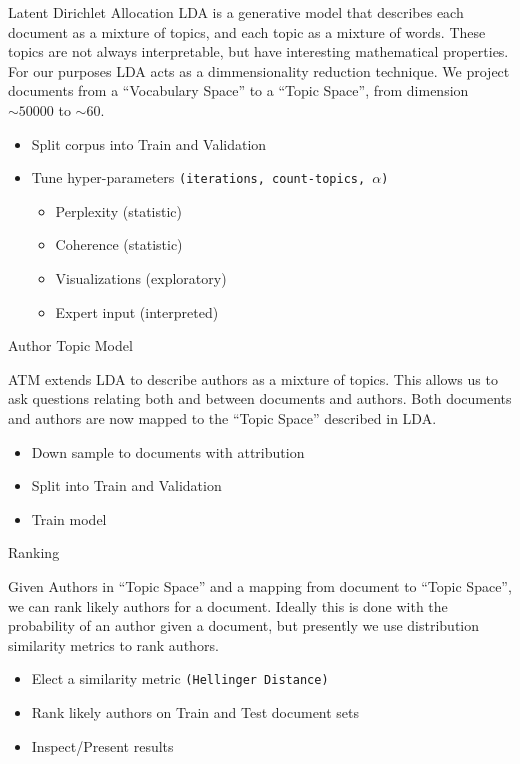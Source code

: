 \documentclass[10pt]{beamer}
\begin{document}
\begin{frame}{Latent Dirichlet Allocation}
  LDA is a generative model that describes each document as a mixture of topics, and each topic as a mixture of words. These topics are not always interpretable, but have interesting mathematical properties. For our purposes LDA acts as a dimmensionality reduction technique. We project documents from a ``Vocabulary Space'' to a ``Topic Space'', from dimension  $\sim50000$ to $\sim60$.

  \vspace{1em}

  \begin{itemize}
  \item Split corpus into Train and Validation
  \item Tune hyper-parameters \texttt{(iterations, count-topics, $\alpha$)}
    \begin{itemize}
    \item Perplexity (statistic)
    \item Coherence (statistic)
    \item Visualizations (exploratory)
    \item Expert input (interpreted)
    \end{itemize}
  \end{itemize}

\end{frame}

\begin{frame}{Author Topic Model}

  ATM extends LDA to describe authors as a mixture of topics. This allows us to ask questions relating both and between documents and authors. Both documents and authors are now mapped to the ``Topic Space'' described in LDA.

  \begin{itemize}
  \item Down sample to documents with attribution
  \item Split into Train and Validation
  \item Train model
  \end{itemize}

\end{frame}

\begin{frame}{Ranking}

  Given Authors in ``Topic Space'' and a mapping from document to ``Topic Space'', we can rank likely authors for a document. Ideally this is done with the probability of an author given a document, but presently we use distribution similarity metrics to rank authors.

  \begin{itemize}
  \item Elect a similarity metric \texttt{(Hellinger Distance)}
  \item Rank likely authors on Train and Test document sets
  \item Inspect/Present results
  \end{itemize}
\end{frame}
\end{document}
